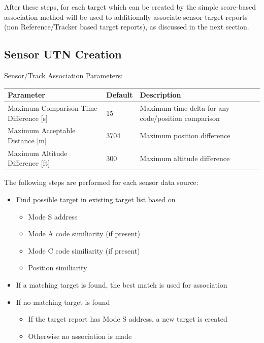 After these steps, for each target which can be created by the simple score-based association method will be used to additionally associate sensor target reports (non Reference/Tracker based target reports), as discussed in the next section.

\subsection{Sensor UTN Creation}

Sensor/Track Association Parameters:
\begin{table}[H]
  \center
  \begin{tabularx}{\textwidth}{ | l | l | X |}
    \hline
    \textbf{Parameter} & \textbf{Default} &  \textbf{Description} \\ \hline
    Maximum Comparison Time Difference [s] & 15 & Maximum time delta for any code/position comparison \\ \hline
    Maximum Acceptable Distance [m] & 3704 & Maximum position difference \\ \hline
    Maximum Altitude Difference [ft] & 300 & Maximum altitude difference \\ \hline
  \end{tabularx}
\end{table}

The following steps are performed for each sensor data source:
\begin{itemize}
\item Find possible target in existing target list based on
\begin{itemize}
\item Mode S address
\item Mode A code similiarity (if present)
\item Mode C code similiarity (if present)
\item Position similiarity
\end{itemize}
\item If a matching target is found, the best match is used for association
\item If no matching target is found
\begin{itemize}
\item If the target report has Mode S address, a new target is created
\item Otherwise no association is made
\end{itemize}
\end{itemize}
\ \\

